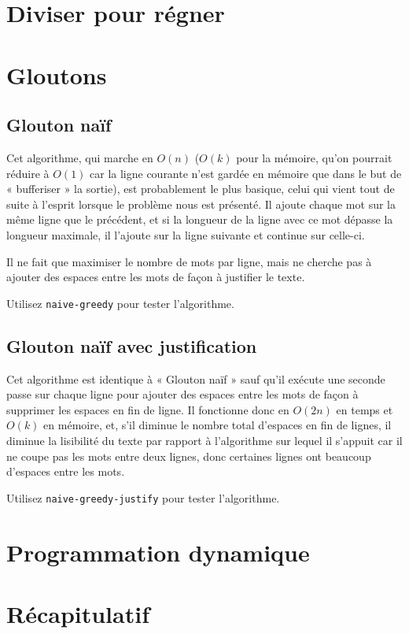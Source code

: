 \documentclass{article}
\begin{document}
\section{Diviser pour régner}

\section{Gloutons}

\subsection{Glouton naïf}

Cet algorithme, qui marche en $O(n)$ ($O(k)$ pour la mémoire, qu'on pourrait
réduire à $O(1)$ car la ligne courante n'est gardée en mémoire que dans le but
de « bufferiser » la sortie), est probablement le plus basique, celui qui vient
tout de suite à l'esprit lorsque le problème nous est présenté. Il ajoute chaque
mot sur la même ligne que le précédent, et si la longueur de la ligne avec ce
mot dépasse la longueur maximale, il l'ajoute sur la ligne suivante et continue
sur celle-ci.

Il ne fait que maximiser le nombre de mots par ligne, mais ne cherche pas à
ajouter des espaces entre les mots de façon à justifier le texte.

Utilisez \verb|naive-greedy| pour tester l’algorithme.

\subsection{Glouton naïf avec justification}

Cet algorithme est identique à « Glouton naïf » sauf qu'il exécute une seconde
passe sur chaque ligne pour ajouter des espaces entre les mots de façon à
supprimer les espaces en fin de ligne. Il fonctionne donc en $O(2n)$ en temps et
$O(k)$ en mémoire, et, s'il diminue le nombre total d'espaces en fin de lignes,
il diminue la lisibilité du texte par rapport à l'algorithme sur lequel il
s'appuit car il ne coupe pas les mots entre deux lignes, donc certaines lignes
ont beaucoup d'espaces entre les mots.

Utilisez \verb|naive-greedy-justify| pour tester l’algorithme.

\section{Programmation dynamique}

\section{Récapitulatif}
\end{document}
